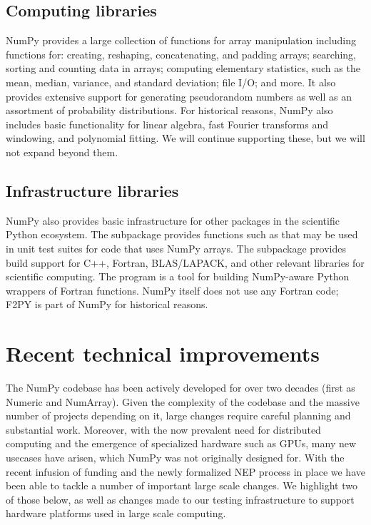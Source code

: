 \subsection*{Computing libraries}

NumPy provides a large collection of functions for array manipulation
including functions for: creating, reshaping, concatenating, and padding arrays;
searching, sorting and counting data
in arrays; computing elementary statistics, such as the mean, median,
variance, and standard deviation; file I/O; and more.
It also provides extensive support for generating pseudorandom numbers
as well as an assortment of probability distributions.
For historical reasons, NumPy also includes basic functionality for
linear algebra, fast Fourier transforms and windowing,
and polynomial fitting.
We will continue supporting these, but we will not expand beyond them.

\subsection*{Infrastructure libraries}

NumPy also provides basic infrastructure for other packages in the scientific
Python ecosystem.
The  subpackage provides functions such as
 that may be used in unit
test suites for code that uses NumPy arrays.
The  subpackage provides build support for C++, Fortran,
BLAS/LAPACK, and other relevant libraries for scientific computing.
The program  is a tool for
building NumPy-aware Python wrappers of Fortran functions.
NumPy itself does not use any Fortran code;  F2PY is part of NumPy
for historical reasons.

\section*{Recent technical improvements}

The NumPy codebase has been actively developed for over two decades (first as
Numeric and NumArray).
Given the complexity of the codebase and the massive number of projects depending
on it, large changes require careful planning and substantial work.
Moreover, with the now prevalent need for distributed computing and the
emergence of specialized hardware such as GPUs, many new usecases have
arisen, which NumPy was not originally designed for.
With the recent infusion of funding and the newly formalized NEP process in
place we have been able to tackle a number of important large scale changes.
We highlight two of those below, as well as changes made to our testing
infrastructure to support hardware platforms used in large scale computing.

